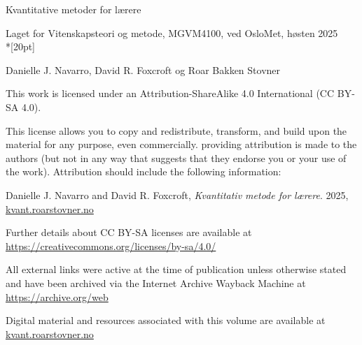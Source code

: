 \hspace{0pt}
\vfill
\begin{center}

\Huge{Kvantitative metoder for lærere}

\Large{Laget for Vitenskapsteori og metode, MGVM4100, ved OsloMet, høsten 2025}\\*[20pt]

\normalsize{Danielle J. Navarro, David R. Foxcroft og Roar Bakken Stovner}

\vfill
\end{center}
\hspace{0pt}
\pagebreak

\hspace{0pt}
\vfill


This work is licensed under an Attribution-ShareAlike 4.0 International (CC BY-SA 4.0).

This license allows you to copy and redistribute, transform, and build upon the material for any purpose, even commercially. providing attribution is made to the authors (but not in any way that suggests that they endorse you or your use of the work). Attribution should include the following information:

Danielle J. Navarro and David R. Foxcroft, \textit{Kvantitativ metode for lærere}. 2025, \url{kvant.roarstovner.no}

Further details about CC BY-SA licenses are available at \\ \url{https://creativecommons.org/licenses/by-sa/4.0/}

All external links were active at the time of publication unless otherwise stated and have been archived via the Internet Archive Wayback Machine at \\ \url{https://archive.org/web}

Digital material and resources associated with this volume are available at \\ \url{kvant.roarstovner.no}

\vfill
\hspace{0pt}
\pagebreak

